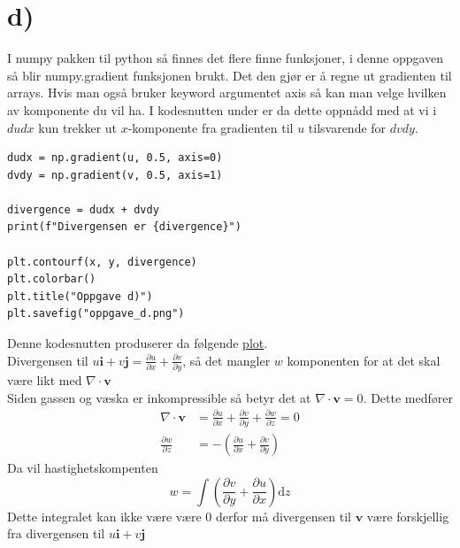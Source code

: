 \documentclass[a4paper,10pt,norsk]{article}
\newcommand{\dd}[1]{\mathrm{d}#1}
\begin{document}
	\section*{d)}\label{ass:d}
	I numpy pakken til python så finnes det flere finne funksjoner, i denne oppgaven så blir numpy.gradient funksjonen brukt. 
	Det den gjør er å regne ut gradienten til arrays. 
	Hvis man også bruker keyword argumentet axis så kan man velge hvilken av komponente du vil ha. 
	I kodesnutten under er da dette oppnådd med at vi i $dudx$ kun trekker ut $x$-komponente fra gradienten til $u$ tilsvarende for  $dvdy$.
	\begin{lstlisting}[caption=Oppgave d]
dudx = np.gradient(u, 0.5, axis=0)
dvdy = np.gradient(v, 0.5, axis=1)

divergence = dudx + dvdy
print(f"Divergensen er {divergence}")

plt.contourf(x, y, divergence)
plt.colorbar()
plt.title("Oppgave d)")
plt.savefig("oppgave_d.png")
	\end{lstlisting}
	Denne kodesnutten produserer da følgende \hyperref[fig:d]{plot}.\\
	Divergensen til $u \mathbf{i} + v \mathbf{j} = \frac{\partial u}{\partial x} + \frac{\partial v}{\partial y}$, så det mangler $w$ komponenten for at det skal være likt med  $\nabla \cdot \mathbf{v}$\\
	Siden gassen og væska er inkompressible så betyr det at $\nabla \cdot \mathbf{v} = 0$.
	Dette medfører
	\begin{align*}
		\nabla \cdot \mathbf{v} &= \frac{\partial u}{\partial x} + \frac{\partial v}{\partial y} + \frac{\partial w}{\partial z} = 0\\
		\frac{\partial w}{\partial z} &= - \left( \frac{\partial u}{\partial x} + \frac{\partial v}{\partial y} \right) 
	\end{align*}
	Da vil hastighetskompenten \[
	w = \int \left( \frac{\partial v}{\partial y} + \frac{\partial u}{\partial x} \right) \dd{z}

	\] 
	Dette integralet kan ikke være være $0$ derfor må divergensen til $\mathbf{v}$ være forskjellig fra divergensen til $u \mathbf{i} + v \mathbf{j}$ 
\end{document}

